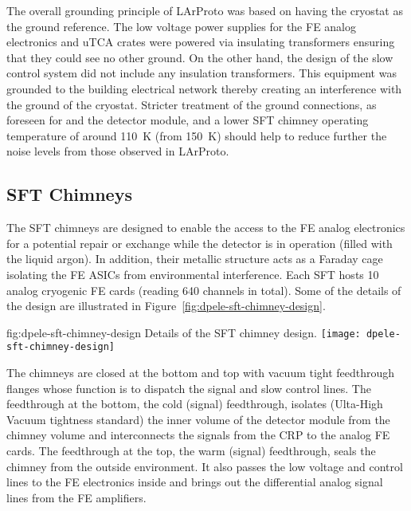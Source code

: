 The overall grounding principle of LArProto was based on having the cryostat as the ground reference. The low voltage power supplies for the FE analog electronics and uTCA crates were powered via insulating transformers ensuring that they could see no other ground. On the other hand, the design of the slow control system did not include any insulation transformers. This equipment was grounded to the building electrical network thereby creating an interference with the ground of the cryostat. Stricter treatment of the ground connections, as foreseen for  and the detector module, and a lower SFT chimney operating temperature of around \SI{110}{\kelvin} (from \SI{150}{\kelvin}) should help to reduce further the noise levels from those observed in LArProto.


\subsection{SFT Chimneys}
\label{sec:fddp-tpc-elec-design-sft}

The SFT chimneys are designed to enable the access to the FE analog electronics for a potential repair or exchange while the detector is in operation (filled with the liquid argon). In addition, their metallic structure acts as a Faraday cage isolating the FE ASICs from environmental interference.  Each SFT hosts \num{10} analog cryogenic FE cards (reading \num{640} channels in total).  Some of the details of the design are illustrated in Figure~\ref{fig:dpele-sft-chimney-design}. 

\begin{dunefigure}{fig:dpele-sft-chimney-design}
{Details of the SFT chimney design.}
\texttt{[image: dpele-sft-chimney-design]}
\end{dunefigure}

The chimneys are closed at the bottom and top with vacuum tight feedthrough flanges whose function is to dispatch the signal and slow control lines. The feedthrough at the bottom, the cold (signal) feedthrough, isolates (Ulta-High Vacuum tightness standard) the inner volume of the detector module from the chimney volume and interconnects the signals from the CRP to the analog FE cards. The feedthrough at the top, the warm (signal) feedthrough, seals the chimney from the outside environment. It also passes the low voltage and control lines to the FE electronics inside and brings out the differential analog signal lines from the FE amplifiers. 

